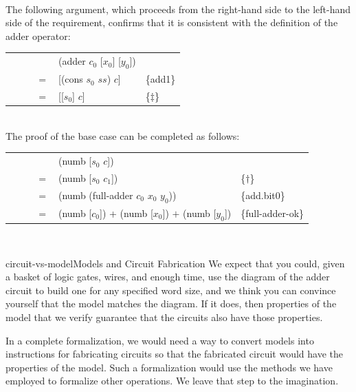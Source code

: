 ~~\vspace{2mm}\\
The following argument, which proceeds
from the right-hand side to the left-hand side of the requirement,
confirms that it is consistent with the definition of the \textsf{adder} operator:\\
\begin{tabular}{rll}
 ~~~~~~~~& \textsf{(adder $c_0$ [$x_0$] [$y_0$])} & \\
$=$ & \textsf{[(cons $s_0$ $ss$) $c$]}       & \{add1\}      \\
$=$ & \textsf{[[$s_0$] $c$]}                 & \{$\ddagger$\}\\
\end{tabular}
~~\vspace{2mm}\\
The proof of the base case can be completed as follows:\\
\begin{tabular}{rll}
 ~~~~~~~~& \textsf{(numb [$s_0$ $c$])}                               &                   \\
$=$ & (\textsf{numb [$s_0$ $c_1$])}                             & \{$\dagger$\}    \\
$=$ & \textsf{(numb (full-adder $c_0$ $x_0$ $y_0$))}            & \{add.bit0\}      \\
$=$ & \textsf{(numb [$c_0$])} + \textsf{(numb [$x_0$])} $+$ \textsf{(numb [$y_0$])} & \{full-adder-ok\} \\
\end{tabular}\\

\begin{aside}{circuit-vs-model}{Models and Circuit Fabrication}
We expect that you could, given a basket of
logic gates, wires, and enough time,
use the diagram of the adder circuit to
build one for any specified word size,
and we think you can convince yourself that the model
matches the diagram.
If it does, then properties of the model
that we verify guarantee that the circuits also have those properties.

In a complete formalization, we would
need a way to convert models into instructions
for fabricating circuits so that
the fabricated circuit would have the properties
of the model. Such a formalization
would use the methods we have employed to formalize other operations.
We leave that step to the imagination.
\end{aside}

